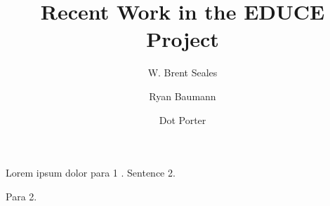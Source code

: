\documentclass[12pt]{article}
\begin{document}
\title{Recent Work in the EDUCE Project}
\author{W. Brent Seales
\and Ryan Baumann \\
\and Dot Porter}
\date{}

\maketitle

\section*{}

Lorem ipsum dolor para 1 \cite{Brown:2000p6405}. Sentence 2.

Para 2.

\section*{}

\section*{}



\end{document}
